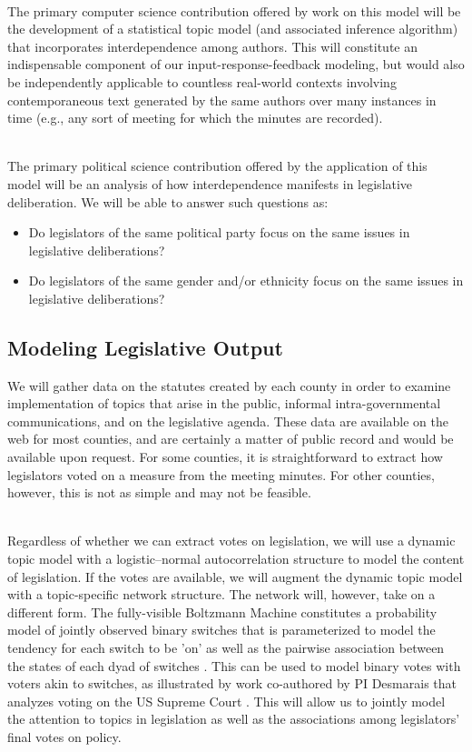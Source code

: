 ~\\
 The primary computer
science contribution offered by work on this model will be the
development of a statistical topic model (and associated inference
algorithm) that incorporates interdependence among authors. This will
constitute an indispensable component of our input-response-feedback
modeling, but would also be independently applicable to countless
real-world contexts involving contemporaneous text generated by the
same authors over many instances in time (e.g., any sort of meeting
for which the minutes are recorded).

~\\
 The primary political science contribution offered by the application of this model will be an analysis of how interdependence manifests in legislative deliberation. We will be able to answer such questions as:
\begin{itemize}
\item Do legislators of the same political party focus on the same issues in legislative deliberations?
\item Do legislators of the same gender and/or ethnicity focus on the same issues in legislative deliberations?
\end{itemize}


\subsection{Modeling Legislative Output}


  We will gather data on the statutes created by each county in order to examine implementation of topics that arise in the public, informal intra-governmental communications, and on the legislative agenda. These data are available on the web for most counties, and are certainly a matter of public record and would be available upon request. For some counties, it is straightforward to extract how legislators voted on a measure from the meeting minutes. For other counties, however, this is not as simple and may not be feasible.

~\\
 Regardless of whether we can
extract votes on legislation, we will use a dynamic topic model with a
logistic--normal autocorrelation structure to model the content of
legislation. If the votes are available, we will augment the dynamic
topic model with a topic-specific network structure. The network will,
however, take on a different form. The fully-visible Boltzmann Machine
constitutes a probability model of jointly observed binary switches
that is parameterized to model the tendency for each switch to be 'on'
as well as the pairwise association between the states of each dyad of
switches \cite{Gunawardana2008}. This can be used to model binary
votes with voters akin to switches, as illustrated by work co-authored
by PI Desmarais that analyzes voting on the US Supreme Court
\cite{Desmarais2010}. This will allow us to jointly model the
attention to topics in legislation as well as the associations among
legislators' final votes on policy. 


